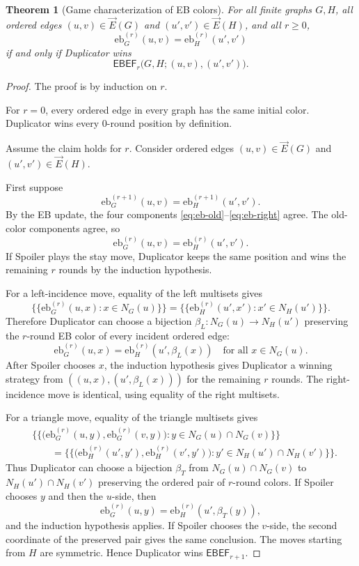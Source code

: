 \documentclass[11pt]{article}
\newtheorem{theorem}{Theorem}[section]
\newcommand{\vecE}{\overrightarrow{E}}
\newcommand{\mset}[1]{\{\!\{#1\}\!\}}
\newcommand{\EBEF}{\mathsf{EBEF}}
\begin{document}
\begin{theorem}[Game characterization of EB colors]
\label{thm:game-color}
For all finite graphs $G,H$, all ordered edges $(u,v)\in\vecE(G)$ and $(u',v')\in\vecE(H)$, and all $r\geq 0$,
\[
\mathrm{eb}^{(r)}_G(u,v)=\mathrm{eb}^{(r)}_H(u',v')
\]
if and only if Duplicator wins
\[
\EBEF_r\bigl(G,H;(u,v),(u',v')\bigr).
\]
\end{theorem}

\begin{proof}
The proof is by induction on $r$.

For $r=0$, every ordered edge in every graph has the same initial color.  Duplicator wins every $0$-round position by definition.

Assume the claim holds for $r$.  Consider ordered edges $(u,v)\in\vecE(G)$ and $(u',v')\in\vecE(H)$.

First suppose
\[
\mathrm{eb}^{(r+1)}_G(u,v)=\mathrm{eb}^{(r+1)}_H(u',v').
\]
By the EB update, the four components \eqref{eq:eb-old}--\eqref{eq:eb-right} agree.
The old-color components agree, so
\[
\mathrm{eb}^{(r)}_G(u,v)=\mathrm{eb}^{(r)}_H(u',v').
\]
If Spoiler plays the stay move, Duplicator keeps the same position and wins the remaining $r$ rounds by the induction hypothesis.

For a left-incidence move, equality of the left multisets gives
\[
\mset{\mathrm{eb}^{(r)}_G(u,x):x\in N_G(u)}
=
\mset{\mathrm{eb}^{(r)}_H(u',x'):x'\in N_H(u')}.
\]
Therefore Duplicator can choose a bijection $\beta_L:N_G(u)\to N_H(u')$ preserving the $r$-round EB color of every incident ordered edge:
\[
\mathrm{eb}^{(r)}_G(u,x)=\mathrm{eb}^{(r)}_H(u',\beta_L(x))
\quad\text{for all }x\in N_G(u).
\]
After Spoiler chooses $x$, the induction hypothesis gives Duplicator a winning strategy from $((u,x),(u',\beta_L(x)))$ for the remaining $r$ rounds.  The right-incidence move is identical, using equality of the right multisets.

For a triangle move, equality of the triangle multisets gives
\begin{align*}
&\mset{\bigl(\mathrm{eb}^{(r)}_G(u,y),\mathrm{eb}^{(r)}_G(v,y)\bigr):y\in N_G(u)\cap N_G(v)}\\
&\qquad=
\mset{\bigl(\mathrm{eb}^{(r)}_H(u',y'),\mathrm{eb}^{(r)}_H(v',y')\bigr):y'\in N_H(u')\cap N_H(v')}.
\end{align*}
Thus Duplicator can choose a bijection $\beta_T$ from $N_G(u)\cap N_G(v)$ to $N_H(u')\cap N_H(v')$ preserving the ordered pair of $r$-round colors.  If Spoiler chooses $y$ and then the $u$-side, then
\[
\mathrm{eb}^{(r)}_G(u,y)=\mathrm{eb}^{(r)}_H(u',\beta_T(y)),
\]
and the induction hypothesis applies.  If Spoiler chooses the $v$-side, the second coordinate of the preserved pair gives the same conclusion.  The moves starting from $H$ are symmetric.  Hence Duplicator wins $\EBEF_{r+1}$.


\end{proof}
\end{document}
